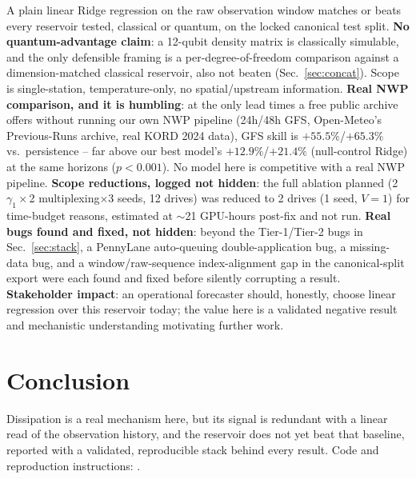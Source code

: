 \documentclass[11pt,twocolumn]{article}
\begin{document}
A plain linear Ridge regression on the raw observation window matches or beats every reservoir
tested, classical or quantum, on the locked canonical test split. \textbf{No quantum-advantage
claim}: a 12-qubit density matrix is classically simulable, and the only defensible framing is a
per-degree-of-freedom comparison against a dimension-matched classical reservoir, also not beaten
(Sec.~\ref{sec:concat}). Scope is single-station, temperature-only, no spatial/upstream
information. \textbf{Real NWP comparison, and it is humbling}: at the only lead times a free public
archive offers without running our own NWP pipeline (24h/48h GFS, Open-Meteo's Previous-Runs
archive, real KORD 2024 data), GFS skill is $+55.5\%$/$+65.3\%$ vs.\ persistence -- far above our
best model's $+12.9\%$/$+21.4\%$ (null-control Ridge) at the same horizons ($p{<}0.001$). No model
here is competitive with a real NWP pipeline. \textbf{Scope reductions, logged not hidden}: the
full ablation planned (2 $\gamma_1\times$2 multiplexing$\times$3 seeds, 12 drives) was reduced to
2 drives (1 seed, $V{=}1$) for time-budget reasons, estimated at $\sim$21 GPU-hours post-fix and
not run. \textbf{Real bugs found and fixed, not hidden}: beyond the Tier-1/Tier-2 bugs in
Sec.~\ref{sec:stack}, a PennyLane auto-queuing double-application bug, a missing-data bug, and a
window/raw-sequence index-alignment gap in the canonical-split export were each found and fixed
before silently corrupting a result. \textbf{Stakeholder impact}: an operational forecaster should,
honestly, choose linear regression over this reservoir today; the value here is a validated
negative result and mechanistic understanding motivating further work.

\section{Conclusion}
Dissipation is a real mechanism here, but its signal is redundant with a linear read of the
observation history, and the reservoir does not yet beat that baseline, reported with a validated,
reproducible stack behind every result. Code and reproduction instructions: \cite{qrcxrepo}.
\end{document}
